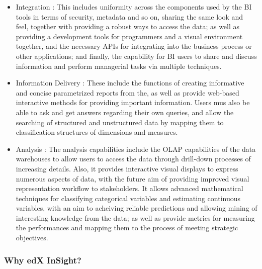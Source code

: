 \documentclass[14pt]{article}
\begin{document}
\begin{itemize}

\item Integration : This includes uniformity across the components used by the BI tools in terms of security, metadata and so on, sharing the same look and feel, together with providing a robust ways to access the data; as well as providing a development tools for programmers and a visual environment together, and the necessary APIs for integrating into the business process or other applications; and finally, the capability for BI users to share and discuss information and perform managerial tasks via multiple techniques.

\item Information Delivery : These include the functions of creating informative and concise parametrized reports from the, as well as provide web-based interactive methods for providing important information. Users mus also be able to ask and get answers regarding their own queries, and allow the searching of structured and unstructured data by mapping them to classification structures of dimensions and measures.

\item Analysis : The analysis capabilities include the OLAP capabilities of the data warehouses to allow users to access the data through drill-down processes of increasing details. Also, it provides interactive visual displays to express numerous aspects of data, with the future aim of providing improved visual representation workflow to stakeholders. It allows advanced mathematical techniques for classifying categorical variables and estimating continuous variables, with an aim to acheiving reliable predictions and allowing mining of interesting knowledge from the data; as well as provide metrics for measuring the performances and mapping them to the process of meeting strategic objectives.

\end{itemize}

\subsubsection{Why edX InSight?}
\end{document}
